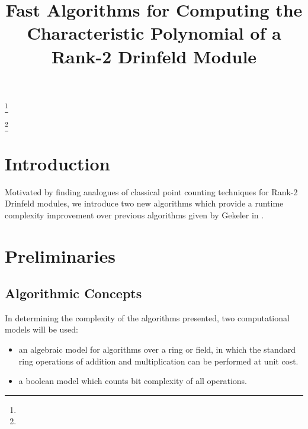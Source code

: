 \documentclass{acmart}
\theoremstyle{remark}
\numberwithin{equation}{section}
\begin{document}
\title[AMS Article Template]{Fast Algorithms for Computing the Characteristic Polynomial of a Rank-2 Drinfeld Module}


\author{}
\address{}
\curraddr{}
\email{}
\thanks{}

\author{}
\address{}
\curraddr{}
\email{}
\thanks{}


\date{}

\dedicatory{}

\begin{abstract}
\end{abstract}

\maketitle


\section{Introduction}

Motivated by finding analogues of classical point counting techniques for Rank-2 Drinfeld modules, we introduce two new algorithms which provide a runtime complexity improvement over previous algorithms given by Gekeler in .

\section{Preliminaries}

\subsection{Algorithmic Concepts}

In determining the complexity of the algorithms presented, two computational models will be used:

\begin{itemize}
\item an algebraic model for algorithms over a ring or field, in which the standard ring operations of addition and multiplication can be performed at unit cost.

\item a boolean model which counts bit complexity of all operations.
\end{itemize}
\end{document}
